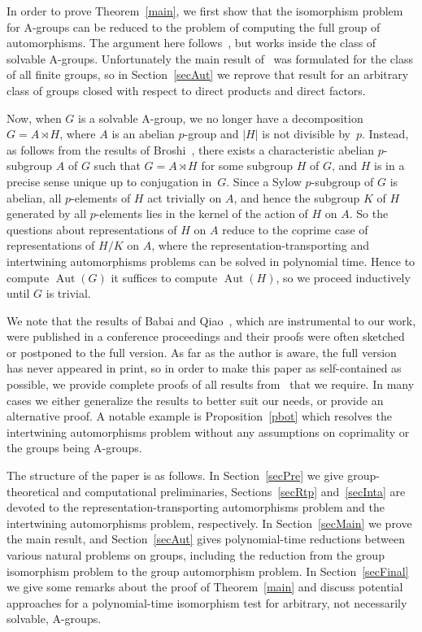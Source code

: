\documentclass{article}
\DeclareMathOperator{\Aut}{Aut}
\begin{document}
In order to prove Theorem~\ref{main}, we first show that the isomorphism problem for A-groups can be reduced to the problem of computing
the full group of automorphisms. The argument here follows~\cite{grpreduct}, but works inside the class of solvable A-groups.
Unfortunately the main result of~\cite{grpreduct} was formulated for the class of all finite groups, so in Section~\ref{secAut}
we reprove that result for an arbitrary class of groups closed with respect to direct products and direct factors.

Now, when \( G \) is a solvable A-group, we no longer have a decomposition \( G = A \rtimes H \),
where \( A \) is an abelian \( p \)-group and \( |H| \) is not divisible by~\( p \). Instead, as follows from the results of Broshi~\cite{broshi},
there exists a characteristic abelian \( p \)-subgroup \( A \) of \( G \) such that \( G = A \rtimes H \) for some subgroup \( H \) of \( G \),
and \( H \) is in a precise sense unique up to conjugation in~\( G \).
Since a Sylow \( p \)-subgroup of \( G \) is abelian, all \( p \)-elements of \( H \) act trivially on \( A \),
and hence the subgroup \( K \) of \( H \) generated by all \( p \)-elements lies in the kernel of the action of \( H \) on \( A \).
So the questions about representations of \( H \) on \( A \) reduce to the coprime case of representations of \( H/K \) on \( A \),
where the representation-transporting and intertwining automorphisms problems can be solved in polynomial time.
Hence to compute \( \Aut(G) \) it suffices to compute \( \Aut(H) \), so we proceed inductively until \( G \) is trivial.

We note that the results of Babai and Qiao~\cite{absyl}, which are instrumental to our work,
were published in a conference proceedings and their proofs were often sketched
or postponed to the full version. As far as the author is aware, the full version has never appeared in print, so in order to make
this paper as self-contained as possible, we provide complete proofs of all results from~\cite{absyl} that we require.
In many cases we either generalize the results to better suit our needs, or provide an alternative proof. A notable example
is Proposition~\ref{pbot} which resolves the intertwining automorphisms problem without any assumptions on coprimality or
the groups being A-groups.

The structure of the paper is as follows. In Section~\ref{secPre} we give group-theoretical and computational preliminaries,
Sections~\ref{secRtp} and~\ref{secInta} are devoted to the representation-transporting automorphisms problem and the intertwining automorphisms problem,
respectively. In Section~\ref{secMain} we prove the main result, and Section~\ref{secAut} gives polynomial-time reductions
between various natural problems on groups, including the reduction from the group isomorphism problem to the group automorphism problem.
In Section~\ref{secFinal} we give some remarks about the proof of Theorem~\ref{main} and discuss potential approaches for a polynomial-time
isomorphism test for arbitrary, not necessarily solvable, A-groups.
\end{document}
